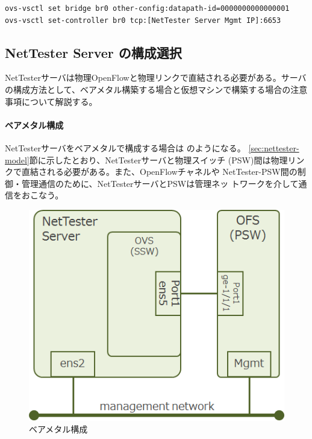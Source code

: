 \begin{lstlisting}[language=sh,caption=物理スイッチのOpenFlow設定,label=lst:psw-openflow-config]
ovs-vsctl set bridge br0 other-config:datapath-id=0000000000000001
ovs-vsctl set-controller br0 tcp:[NetTester Server Mgmt IP]:6653
\end{lstlisting}

  \subsection{NetTester Server の構成選択}
  \label{sec:nettester-server-deploy-pattern}


NetTesterサーバは物理OpenFlowと物理リンクで直結される必要がある。サーバ
の構成方法として、ベアメタル構築する場合と仮想マシンで構築する場合の注意
事項について解説する。

\paragraph{ベアメタル構成}
NetTesterサーバをベアメタルで構成する場合は
のようになる。
\ref{sec:nettester-model}節に示したとおり、NetTesterサーバと物理スイッチ
(PSW)間は物理リンクで直結される必要がある。また、OpenFlowチャネルや
NetTester-PSW間の制御・管理通信のために、NetTesterサーバとPSWは管理ネッ
トワークを介して通信をおこなう。
\begin{figure}[h]
 \centering
 \includegraphics[scale=0.6]{img/nettester-deploy-baremetal.png}
 \caption{ベアメタル構成}
 \label{fig:nettester-deploy-baremetal}
\end{figure}

